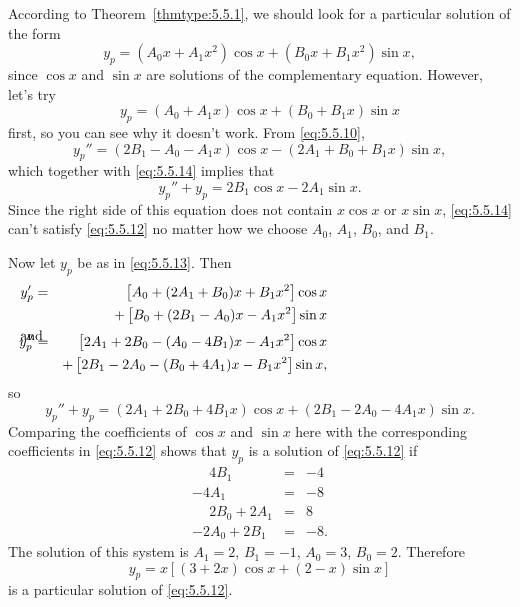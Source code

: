 \begin{examplesolution}
\solution According to Theorem~\ref{thmtype:5.5.1}, we should look for a particular solution of the
form
\begin{equation}
  \label{eq:5.5.13}y_{p}=(A_{0}x+A_{1}x^{2})\cos x+(B_{0}x+B_{1}x^{2})\sin x,
\end{equation}
since $\cos x$ and $\sin x$ are solutions of the complementary equation. However, let's try
\begin{equation}
  \label{eq:5.5.14}y_{p}=(A_{0}+A_{1}x)\cos x+(B_{0}+B_{1}x)\sin x
\end{equation}
first, so you can see why it doesn't work. From \eqref{eq:5.5.10},
\[
  y_{p}''=(2B_{1}-A_{0}-A_{1}x)\cos x-(2A_{1}+B_{0}+B_{1}x)\sin x,
\]
which together with \eqref{eq:5.5.14} implies that
\[
  y_{p}''+y_{p}=2B_{1}\cos x-2A_{1}\sin x.
\]
Since the right side of this equation does not contain $x\cos x$ or $x\sin x$, \eqref{eq:5.5.14}
can't satisfy \eqref{eq:5.5.12} no matter how we choose $A_{0}$, $A_{1}$, $B_{0}$, and $B_{1}$.

Now let $y_{p}$ be as in \eqref{eq:5.5.13}. Then
\begin{eqnarray*}
  y_{p}'                 & = & \left[A_{0}+(2A_{1}+B_{0})x+B_{1}x^{2}\right]\cos x         \\
                         &   & +\left[B_{0}+(2B_{1}-A_{0})x-A_{1}x^{2}\right]\sin x        \\
  \arraytext{and}y_{p}'' & = & \left[2A_{1}+2B_{0}-(A_{0}-4B_{1})x-A_{1}x^{2}\right]\cos x \\
                         &   & +\left[2B_{1}-2A_{0}-(B_{0}+4A_{1})x-B_{1}x^{2}\right]\sin x,
\end{eqnarray*}
so
\[
  y_{p}''+y_{p}=(2A_{1}+2B_{0}+4B_{1}x)\cos x+(2B_{1}-2A_{0}-4A_{1}x)\sin x.
\]
Comparing the coefficients of $\cos x$ and $\sin x$ here with the corresponding coefficients in
\eqref{eq:5.5.12} shows that $y_{p}$ is a solution of \eqref{eq:5.5.12} if
\[
  \begin{array}{rcr}
    \phantom{-}4B_{1}        & = & -4\phantom{.} \\
    -4A_{1}                  & = & -8\phantom{.} \\
    \phantom{-}2B_{0}+2A_{1} & = & 8\phantom{.}  \\
    -2A_{0}+2B_{1}           & = & -8.
  \end{array}
\]
The solution of this system is $A_{1}=2$, $B_{1}=-1$, $A_{0}=3$, $B_{0}=2$. Therefore
\[
  y_{p}=x\left[(3+2x)\cos x+(2-x)\sin x\right]
\]
is a particular solution of \eqref{eq:5.5.12}.
\end{examplesolution}


